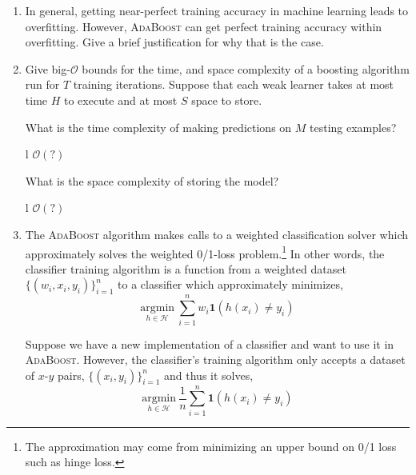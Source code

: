 \documentclass[11pt]{article}
\newcounter{QuestionCounter}
\newcounter{SubQuestionCounter}[QuestionCounter]
\newcommand{\newsubquestion}{\stepcounter{SubQuestionCounter}}
\begin{document}
{\begin{enumerate}[(1)]
\begin{answertext}{1cm}{}
\end{answertext}

\newpage
\newsubquestion
\item In general, getting near-perfect training accuracy in machine learning
  leads to overfitting.  However, \textsc{AdaBoost} can get perfect training accuracy
  within overfitting.  Give a brief justification for why that is the case.

\begin{answertext}{4cm}{}

\end{answertext}


\item Give big-$\mathcal{O}$ bounds for the time, and space complexity of a
  boosting algorithm run for $T$ training iterations.  Suppose that each weak
  learner takes at most time $H$ to execute and at most $S$ space to store.

  What is the time complexity of making predictions on $M$ testing examples?

\begin{answertable}{3cm}{}{l}
 $\mathcal{O}( ? )$
\end{answertable}


  What is the space complexity of storing the model?

\begin{answertable}{3cm}{}{l}
  $\mathcal{O}( ? )$ \\
\end{answertable}

\newpage
\item The \textsc{AdaBoost} algorithm makes calls to a weighted classification
  solver which approximately solves the weighted 0/1-loss problem.\footnote{The
    approximation may come from minimizing an upper bound on 0/1 loss such as
    hinge loss.}  In other words, the classifier training algorithm is a
  function from a weighted dataset $\{ (w_i, x_i, y_i) \}_{i=1}^n$ to a
  classifier which approximately minimizes,
%
\begin{equation}\label{eq:weighted}
  \underset{h \in \mathcal{H}}{\mathrm{argmin}}\ \sum_{i=1}^n w_i \boldsymbol{1}(h(x_i) \ne y_i)
\end{equation}

  Suppose we have a new implementation of a classifier and want to use it in
  \textsc{AdaBoost}.  However, the classifier's training algorithm only accepts
  a dataset of $x$-$y$ pairs, $\{ (x_i, y_i) \}_{i=1}^n$ and thus it solves,
%
\begin{equation}\label{eq:unweighted}
  \underset{h \in \mathcal{H}}{\mathrm{argmin}}\ \frac{1}{n} \sum_{i=1}^n \boldsymbol{1}(h(x_i) \ne y_i)
\end{equation}


\end{enumerate}}
\end{document}
